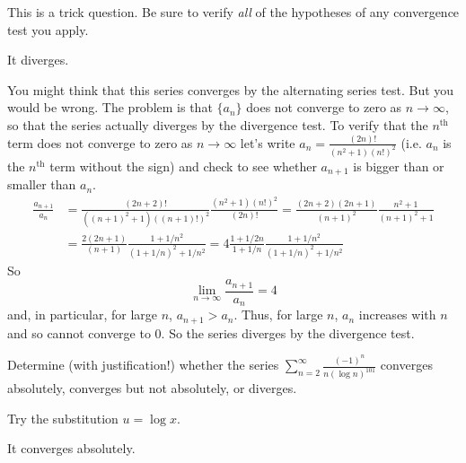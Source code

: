 \begin{hint}
This is a trick question. Be sure to verify \emph{all} of the hypotheses
of any convergence test you apply.
\end{hint}

\begin{answer}
It diverges.
\end{answer}

\begin{solution}
You might think that this series converges by the alternating series test.
But you would be wrong. The problem is that $\{a_n\}$ does not converge to zero as $n\rightarrow\infty$, so that the series actually
diverges by the divergence test. To verify that the $n^{\text{th}}$ term does not converge to zero as $n\rightarrow\infty$ let's write
$a_n= \frac{(2n)!}{(n^2+1)(n!)^2}$ (i.e. $a_n$ is the $n^{\text{th}}$ term
without the sign) and check to see whether $a_{n+1}$ is bigger than or smaller than $a_n$.
\begin{align*}
\frac{a_{n+1}}{a_n}
&=\frac{(2n+2)!}{((n+1)^2+1)((n+1)!)^2}
\frac{(n^2+1)(n!)^2}{(2n)!}
=\frac{(2n+2)(2n+1)}{(n+1)^2}\frac{n^2+1}{(n+1)^2+1} \\
&=\frac{2(2n+1)}{(n+1)}\frac{1+1/n^2}{(1+1/n)^2+1/n^2}
=4\frac{1+1/2n}{1+1/n}\frac{1+1/n^2}{(1+1/n)^2+1/n^2}
\end{align*}
So
\begin{equation*}
\lim_{n\rightarrow\infty}\frac{a_{n+1}}{a_n}=4
\end{equation*}
and, in particular, for large $n$, $a_{n+1}>a_n$. Thus, for large $n$,
$a_n$ increases with $n$ and so cannot converge to $0$. So the series
diverges by the divergence test.
\end{solution}

\begin{Mquestion}[2012A]
Determine (with justification!) whether the series
$\displaystyle\sum_{n=2}^\infty\frac{(-1)^n}{n(\log n)^{101}}$
converges absolutely, converges but not absolutely, or diverges.
\end{Mquestion}

\begin{hint}
Try the substitution $u=\log x$.
\end{hint}

\begin{answer}
It converges absolutely.
\end{answer}

